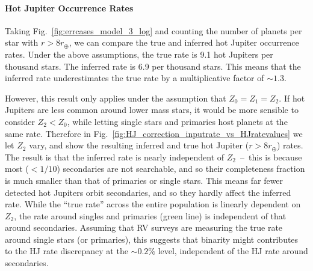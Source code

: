 \paragraph{Hot Jupiter Occurrence Rates}
Taking Fig.~\ref{fig:errcases_model_3_log} and counting the number of planets 
per star with $r>8r_\oplus$, we can compare the true and inferred hot Jupiter 
occurrence rates.
Under the above assumptions, the true rate is 9.1 hot Jupiters 
per thousand stars.
The inferred rate is 6.9 per thousand stars.
This means that the inferred rate underestimates the true rate by a 
multiplicative factor of $\sim\!1.3$.

However, this result only applies under the assumption that $Z_0 = 
Z_1 = Z_2$.
If hot Jupiters are less common around lower mass stars, it would be more 
sensible to consider $Z_2<Z_0$, while letting single stars and 
primaries host planets at the same rate.
Therefore in Fig.~\ref{fig:HJ_correction_inputrate_vs_HJratevalues} we let 
$Z_2$ vary, and show the resulting inferred and true hot Jupiter 
($r>8r_\oplus$) rates.
The result is that the inferred rate is nearly independent of 
$Z_2$~--~this is because most ($<1/10$) secondaries are not searchable, 
and so their completeness fraction is much smaller than that of primaries or 
single stars.
This means far fewer detected hot Jupiters orbit secondaries, and so they 
hardly affect the inferred rate.
While the ``true rate'' across the entire population is linearly dependent on 
$Z_2$, the rate around 
singles and primaries (green line) is independent of that around secondaries.
Assuming that RV surveys are measuring the true rate around single stars (or 
primaries), this suggests that binarity might contributes to the 
HJ rate discrepancy at the $\sim 0.2\%$ level, independent of the HJ rate 
around secondaries.


